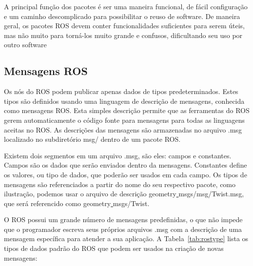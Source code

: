 A principal função dos pacotes é ser uma maneira funcional, de fácil configuração e um caminho descomplicado para possibilitar o reuso de software. De maneira geral, os pacotes ROS devem conter funcionalidades suficientes para serem úteis, mas não muito para torná-los muito grande e confusos, dificultando seu uso por outro software 


\subsection{Mensagens ROS}
Os nós do ROS podem publicar apenas dados de tipos predeterminados. Estes tipos são definidos usando uma linguagem de descrição de mensagens, conhecida como mensagens ROS\@. Esta simples descrição permite que as ferramentas do ROS gerem automaticamente o código fonte para mensagens para todas as linguagens aceitas no ROS\@. As descrições das mensagens são armazenadas no arquivo .msg localizado no subdiretório msg/ dentro de um pacote ROS\@.

Existem dois segmentos em um arquivo .msg, são eles: campos e constantes. Campos são os dados que serão enviados dentro da mensagens. Constantes define os valores, ou tipo de dados, que poderão ser usados em cada campo. Os tipos de mensagens são referenciados a partir do nome do seu respectivo pacote, como ilustração, podemos usar o arquivo de descrição geometry\underline{ }msgs/msg/Twist.msg, que será referencido como geometry\underline{ }msgs/Twist. 

O ROS possui um grande número de mensagens predefinidas, o que não impede que o programador escreva seus próprios arquivos .msg com a descrição de uma mensagem específica para atender a sua aplicação. A Tabela~\ref{tab:rostype} lista os tipos de dados padrão do ROS que podem ser usados na criação de novas mensagens: 

